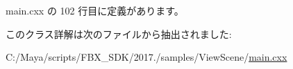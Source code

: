  main.\+cxx の 102 行目に定義があります。



このクラス詳解は次のファイルから抽出されました\+:\begin{DoxyCompactItemize}
\item 
C\+:/\+Maya/scripts/\+F\+B\+X\+\_\+\+S\+D\+K/2017./samples/\+View\+Scene/\hyperlink{_view_scene_2main_8cxx}{main.\+cxx}\end{DoxyCompactItemize}
